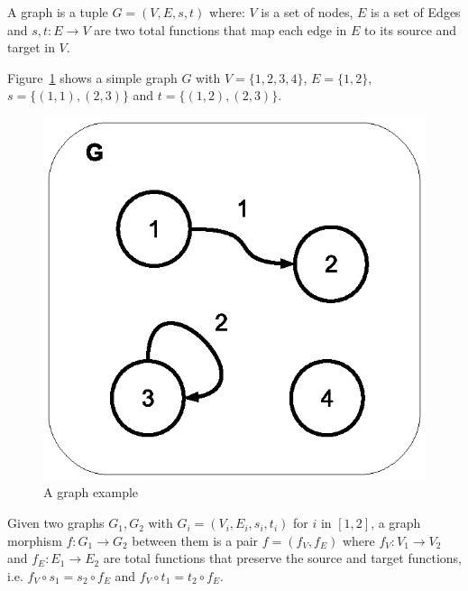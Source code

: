 \begin{definition}[Graph] A graph is a tuple $G = \left(V,E,s,t\right)$ where: $V$ is a set of nodes, $E$ is a set of Edges and $s,t : E \rightarrow V$ are two total functions that map each edge in $E$ to its source and target in $V$.

\end{definition}

\begin{example}[Graph] Figure~\ref{fig:gts:graph} shows a simple graph $G$ with $V = \{1,2,3,4\}$, $E = \{1,2\}$, $s =\{(1,1),(2,3)\}$ and $t = \{(1,2),(2,3)\}$.
\begin{figure}[!ht]
  \centering
  \includegraphics[scale=0.8]{images/gts/graph}
  \caption{A graph example}\label{fig:gts:graph}
\end{figure}
\end{example}

\begin{definition} Given two graphs $G_1,G_2$ with $G_i = \left(V_i, E_i, s_i, t_i\right)$ for $i$ in $[1,2]$, a graph morphism $f : G_1 \rightarrow G_2$ between them is a pair $f = \left(f_V,f_E\right)$ where $f_V : V_1 \rightarrow V_2$ and $f_E : E_1 \rightarrow E_2$ are total functions that preserve the source and target functions, i.e. $f_V \circ s_1 = s_2 \circ f_E$ and $f_V \circ t_1 = t_2 \circ f_E$.  
\end{definition}

